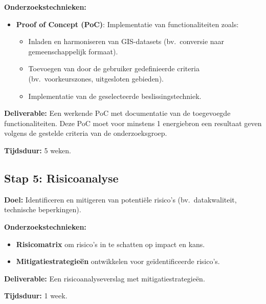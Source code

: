 \textbf{Onderzoekstechnieken:}
\begin{itemize}
    \item \textbf{Proof of Concept (PoC)}: Implementatie van functionaliteiten zoals:
    \begin{itemize}
        \item Inladen en harmoniseren van GIS-\-datasets (bv.\ conversie naar gemeenschappelijk formaat).
        \item Toevoegen van door de gebruiker gedefinieerde criteria (bv.\ voorkeurszones, uitgesloten gebieden).
        \item Implementatie van de geselecteerde beslissingstechniek.
    \end{itemize}
\end{itemize}

\textbf{Deliverable:}
Een werkende PoC met documentatie van de toegevoegde functionaliteiten. Deze PoC moet voor minstens 1 energiebron een resultaat geven volgens de gestelde criteria van de onderzoeksgroep.

\textbf{Tijdsduur:}
5 weken.

\subsection{Stap 5: Risicoanalyse}
\textbf{Doel:}
Identificeren en mitigeren van potentiële risico's (bv.\ datakwaliteit, technische beperkingen).

\textbf{Onderzoekstechnieken:}
\begin{itemize}
    \item \textbf{Risicomatrix} om risico's in te schatten op impact en kans.
    \item \textbf{Mitigatiestrategieën} ontwikkelen voor geïdentificeerde risico's.
\end{itemize}

\textbf{Deliverable:}
Een risicoanalyseverslag met mitigatiestrategieën.

\textbf{Tijdsduur:}
1 week.



